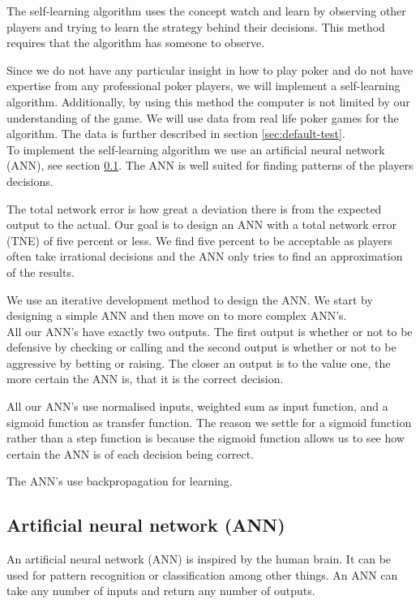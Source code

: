 The self-learning algorithm uses the concept watch and learn by observing other players and trying to learn the strategy behind their decisions. This method requires that the algorithm has someone to observe.

Since we do not have any particular insight in how to play poker and do not have expertise from any professional poker players, we will implement a self-learning algorithm. Additionally, by using this method the computer is not limited by our understanding of the game. We will use data from real life poker games for the algorithm. The data is further described in section \ref{sec:default-test}.\\

To implement the self-learning algorithm we use an artificial neural network (ANN), see section \ref{sec:nn}. The ANN is well suited for finding patterns of the players decisions. 

The total network error is how great a deviation there is from the expected output to the actual. Our goal is to design an ANN with a total network error (TNE) of five percent or less. We find five percent to be acceptable as players often take irrational decisions and the ANN only tries to find an approximation of the results. 

We use an iterative development method to design the ANN. We start by designing a simple ANN and then move on to more complex ANN's.\\

All our ANN's have exactly two outputs. The first output is whether or not to be defensive by checking or calling and the second output is whether or not to be aggressive by betting or raising. The closer an output is to the value one, the more certain the ANN is, that it is the correct decision. 

All our ANN's use normalised inputs, weighted sum as input function, and a sigmoid function as transfer function. The reason we settle for a sigmoid function rather than a step function is because the sigmoid function allows us to see how certain the ANN is of each decision being correct.

The ANN's use backpropagation for learning.

\subsection{Artificial neural network (ANN)}
\label{sec:nn}
An artificial neural network (ANN) is inspired by the human brain. It can be used for pattern recognition or classification among other things. An ANN can take any number of inputs and return any number of outputs. 

